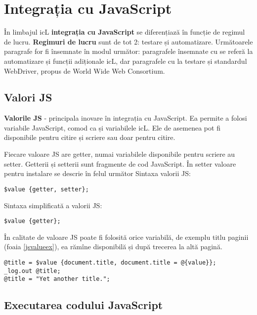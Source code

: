 \section{Integrația cu JavaScript}

În limbajul icL {\bf integrația cu JavaScript} se diferențiază în funcție de regimul de lucru. {\bf Regimuri de lucru} sunt de tot 2: testare și automatizare. Următoarele paragrafe for fi însemnate în modul următor: paragrafele însemnate cu \code{[icL]} se referă la automatizare și funcții adiționale icL, dar paragrafele cu \code{[w3c]} la testare și standardul WebDriver, propus de World Wide Web Consortium.

\subsection{Valori JS}

{\bf Valorile JS} - principala inovare în integrația cu JavaScript. Ea permite a folosi variabile JavaScript, comod ca și variabilele icL. Ele de asemenea pot fi disponibile pentru citire și scriere sau doar pentru citire.

Fiecare valoare JS are getter, numai variabilele disponibile pentru scriere au setter. Getterii și setterii sunt fragmente de cod JavaScript. În setter valoare pentru instalare se descrie în felul următor  Sintaxa valorii JS:
\begin{lstlisting}[numbers=none]
$value {getter, setter};
\end{lstlisting}

Sintaxa simplificată a valorii JS:
\begin{lstlisting}[numbers=none]
$value {getter};
\end{lstlisting}

În calitate de valoare JS poate fi folosită orice variabilă, de exemplu titlu paginii (foaia \ref{jsvalueex}), ea rămîne disponibilă și după trecerea la altă pagină.

\begin{lstlisting}[caption=Folosirea valorii JS, label=jsvalueex]
@title = $value {document.title, document.title = @{value}};
_log.out @title;
@title = "Yet another title.";
\end{lstlisting}

\subsection{Executarea codului JavaScript}

